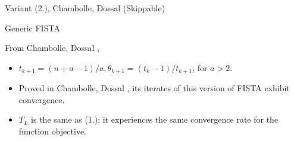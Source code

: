 \documentclass[11pt]{beamer}
\theoremstyle{definition}
\begin{document}
    \begin{frame}{Variant (2.), Chambolle, Dossal (Skippable)}
        \begin{algorithm}[H]
            \begin{tiny}
                \begin{algorithmic}[1]
                    \ENDFOR
                \end{algorithmic}
                \caption{Generic FISTA}    
            \end{tiny}
        \end{algorithm}
        From Chambolle, Dossal \cite{chambolle_convergence_2015}, 
        \begin{itemize}
            \item $t_{k + 1} = (n + a - 1)/a, \theta_{k + 1} = (t_{k} - 1)/t_{k + 1}$, for $a > 2$. 
            \item Proved in Chambolle, Dossal \cite[thm 4.1]{chambolle_convergence_2015}, its iterates of this version of FISTA exhibit convergence. 
            \item $T_L$ is the same as (1.); it experiences the same convergence rate for the function objective. 
        \end{itemize}
    \end{frame}
\end{document}
